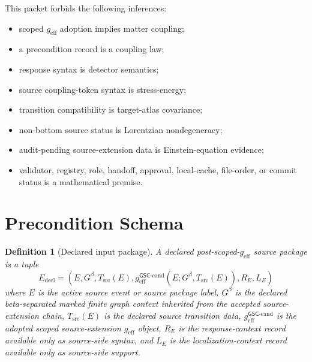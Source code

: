 \documentclass[11pt]{article}
\newcommand{\Gbeta}{G^\beta}
\newcommand{\geff}{g_{\mathrm{eff}}}
\newcommand{\geffCand}{g_{\mathrm{eff}}^{\mathsf{GSC}\mbox{-}\mathrm{cand}}}
\newtheorem{definition}{Definition}
\begin{document}
This packet forbids the following inferences:

\begin{itemize}[leftmargin=*]
  \item scoped \(\geff\) adoption implies matter coupling;
  \item a precondition record is a coupling law;
  \item response syntax is detector semantics;
  \item source coupling-token syntax is stress-energy;
  \item transition compatibility is target-atlas covariance;
  \item non-bottom source status is Lorentzian nondegeneracy;
  \item audit-pending source-extension data is Einstein-equation evidence;
  \item validator, registry, role, handoff, approval, local-cache, file-order,
  or commit status is a mathematical premise.
\end{itemize}

\section{Precondition Schema}

\begin{definition}[Declared input package]
A declared post-scoped-\(\geff\) source package is a tuple
\[
  E_{\mathrm{decl}}=
  (E,\Gbeta,T_{\mathrm{src}}(E),\geffCand(E;\Gbeta,T_{\mathrm{src}}(E)),
  R_E,L_E)
\]
where \(E\) is the active source event or source package label, \(\Gbeta\) is
the declared beta-separated marked finite graph context inherited from the
accepted source-extension chain, \(T_{\mathrm{src}}(E)\) is the declared
source transition data, \(\geffCand\) is the adopted scoped source-extension
\(\geff\) object, \(R_E\) is the response-context record available only as
source-side syntax, and \(L_E\) is the localization-context record available
only as source-side support.
\end{definition}
\end{document}
